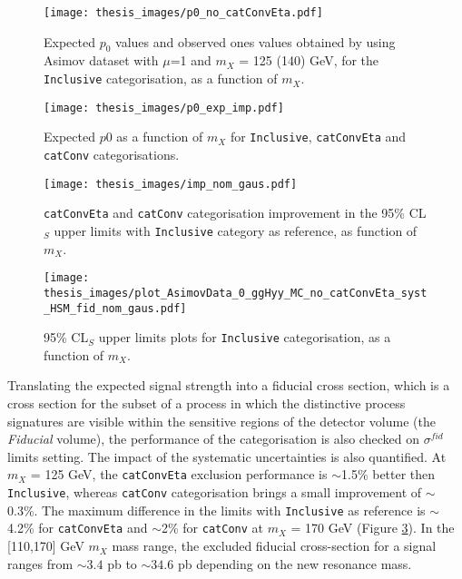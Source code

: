 \documentclass[a4paper, oneside, 11pt, openright]{book}
\begin{document}
 			\begin{figure}
 				\centering
 				\texttt{[image: thesis\_images/p0\_no\_catConvEta.pdf]}
 				\caption{Expected $p_0$ values and observed ones values obtained by using Asimov dataset with $\mu$=1 and $m_X$ = 125 (140) GeV, for the \texttt{Inclusive} categorisation, as a function of $m_X$.}
 				\label{fig:p0_res_inc}
 			\end{figure}
 			\begin{figure}
 				\centering
 				\texttt{[image: thesis\_images/p0\_exp\_imp.pdf]}
 				\caption{Expected $p0$ as a function of $m_X$ for \texttt{Inclusive}, \texttt{catConvEta} and \texttt{catConv} categorisations.}
 				\label{fig:p0_comp}
 			\end{figure}
 			\begin{figure}
 				\centering
 				\texttt{[image: thesis\_images/imp\_nom\_gaus.pdf]}
 				\caption{\texttt{catConvEta} and \texttt{catConv} categorisation improvement in the 95\% CL$_S$ upper limits with \texttt{Inclusive} category as reference, as function of $m_X$.}
 				\label{fig:limits_comp}
 			\end{figure}
 			\begin{figure}
 				\centering
 				\texttt{[image: thesis\_images/plot\_AsimovData\_0\_ggHyy\_MC\_no\_catConvEta\_syst\_HSM\_fid\_nom\_gaus.pdf]}
 				\caption{95\% CL$_S$ upper limits plots for \texttt{Inclusive} categorisation, as a function of $m_X$.}
 				\label{fig:limit_HSM_inc}
 			\end{figure}
 			Translating the expected signal strength into a fiducial cross section, which is a cross section for the subset of a process in which the distinctive process signatures are visible within the sensitive regions of the detector volume (the \textit{Fiducial} volume), the performance of the categorisation is also checked on $\sigma^{fid}$ limits setting. The impact of the systematic uncertainties is also quantified. At $m_X$ = 125 GeV, the \texttt{catConvEta} exclusion performance is $\sim$1.5\% better then \texttt{Inclusive}, whereas \texttt{catConv} categorisation brings a small improvement of $\sim$0.3\%. The maximum difference in the limits with \texttt{Inclusive} as reference is $\sim$4.2\% for \texttt{catConvEta} and $\sim$2\% for \texttt{catConv} at $m_X$ = 170 GeV (Figure \ref{fig:limits_comp}). In the [110,170] GeV $m_X$ mass range, the excluded fiducial cross-section for a signal ranges from $\sim 3.4$ pb to $\sim 34.6$ pb depending on the new resonance mass. 
 			
\end{document}
